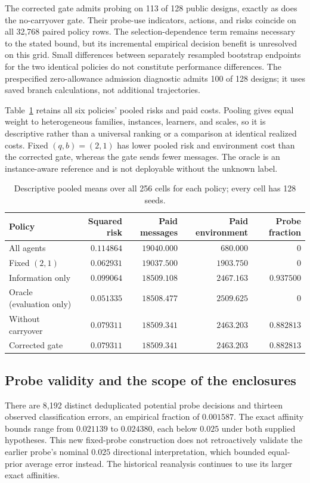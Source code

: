 \documentclass[journal]{IEEEtran}
\begin{document}
The corrected gate admits probing on 113 of 128 public designs, exactly as does the no-carryover gate.
Their probe-use indicators, actions, and risks coincide on all 32,768 paired policy rows.
The selection-dependence term remains necessary to the stated bound, but its incremental empirical decision benefit is unresolved on this grid.
Small differences between separately resampled bootstrap endpoints for the two identical policies do not constitute performance differences.
The prespecified zero-allowance admission diagnostic admits 100 of 128 designs; it uses saved branch calculations, not additional trajectories.

Table~\ref{tab:direct-costs} retains all six policies' pooled risks and paid costs.
Pooling gives equal weight to heterogeneous families, instances, learners, and scales, so it is descriptive rather than a universal ranking or a comparison at identical realized costs.
Fixed $(q,b)=(2,1)$ has lower pooled risk and environment cost than the corrected gate, whereas the gate sends fewer messages.
The oracle is an instance-aware reference and is not deployable without the unknown label.
\begin{table}[t]
\centering
\caption{Descriptive pooled means over all 256 cells for each policy; every cell has 128 seeds.}
\label{tab:direct-costs}
\begin{tabular}{lrrrr}
\toprule
Policy & Squared risk & Paid messages & Paid environment & Probe fraction \\
\midrule
All agents & $0.114864$ & $19040.000$ & $680.000$ & $0$ \\
Fixed $(2,1)$ & $0.062931$ & $19037.500$ & $1903.750$ & $0$ \\
Information only & $0.099064$ & $18509.108$ & $2467.163$ & $0.937500$ \\
Oracle (evaluation only) & $0.051335$ & $18508.477$ & $2509.625$ & $0$ \\
Without carryover & $0.079311$ & $18509.341$ & $2463.203$ & $0.882813$ \\
Corrected gate & $0.079311$ & $18509.341$ & $2463.203$ & $0.882813$ \\
\bottomrule
\end{tabular}
\end{table}

\subsection{Probe validity and the scope of the enclosures}
There are 8,192 distinct deduplicated potential probe decisions and thirteen observed classification errors, an empirical fraction of $0.001587$.
The exact affinity bounds range from $0.021139$ to $0.024380$, each below $0.025$ under both supplied hypotheses.
This new fixed-probe construction does not retroactively validate the earlier probe's nominal $0.025$ directional interpretation, which bounded equal-prior average error instead.
The historical reanalysis continues to use its larger exact affinities.
\end{document}
